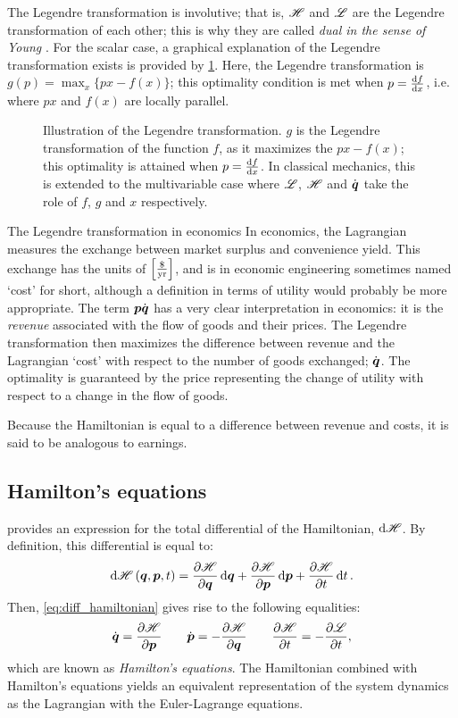 The Legendre transformation is involutive; that is, $\mathscr{H}$ and $\mathscr{L}$ are the Legendre transformation of each other; this is why they are called \emph{dual in the sense of Young} \cite{Arnold1989}. For the scalar case, a graphical explanation of the Legendre transformation exists is provided by \cref{fig:legendre_transform}. Here, the Legendre transformation is $g(p) = \max_x \{px - f(x)\}$; this optimality condition is met when $p = \dv{f}{x}$, i.e. where $px$ and $f(x)$ are locally parallel.
\begin{figure}
    \centering
    
    \caption{Illustration of the Legendre transformation. $g$ is the Legendre transformation of the function $f$, as it maximizes the $px - f(x)$; this optimality is attained when $p = \dv{f}{x}$. In classical mechanics, this is extended to the multivariable case where $\mathscr{L}$, $\mathscr{H}$ and $\dot{\vb*{q}}$ take the role of $f$, $g$ and $x$ respectively.}
    \label{fig:legendre_transform}
\end{figure}

\begin{econ}{The Legendre transformation in economics}
    In economics, the Lagrangian measures the exchange between market surplus and convenience yield. This exchange has the units of $\qty[\frac{\$}{\text{yr}}]$, and is in economic engineering sometimes named `cost' for short, although a definition in terms of utility would probably be more appropriate. The term $\vb*{p}\dot{\vb*{q}}$ has a very clear interpretation in economics: it is the \emph{revenue} associated with the flow of goods and their prices. The Legendre transformation then maximizes the difference between revenue and the Lagrangian `cost' with respect to the number of goods exchanged; $\dot{\vb*{q}}$. The optimality is guaranteed by the price representing the change of utility with respect to a change in the flow of goods.

    Because the Hamiltonian is equal to a difference between revenue and costs, it is said to be analogous to earnings.
\end{econ}

\subsection{Hamilton's equations}
\label{sec:hamilton_eqs}
 provides an expression for the total differential of the Hamiltonian, $\dd{\ensuremath{\mathscr{H}}}$. By definition, this differential is equal to:
$$ \dd{\ensuremath{\mathscr{H}}}(\vb*{q}, \vb*{p}, t) = \pdv{\ensuremath{\mathscr{H}}}{\ensuremath{\vb*{q}}}\dd{\ensuremath{\vb*{q}}} + \pdv{\ensuremath{\mathscr{H}}}{\ensuremath{\vb*{p}}}\dd{\ensuremath{\vb*{p}}} + \pdv{\ensuremath{\mathscr{H}}}{t}\dd{t}. $$
Then, \cref{eq:diff_hamiltonian} gives rise to the following equalities:
\begin{equation}
    \dot{\vb*{q}} = \pdv{\ensuremath{\mathscr{H}}}{\ensuremath{\vb*{p}}} \qquad \dot{\vb*{p}} = -\pdv{\ensuremath{\mathscr{H}}}{\ensuremath{\vb*{q}}} \qquad \pdv{\ensuremath{\mathscr{H}}}{t} = - \pdv{\ensuremath{\mathscr{L}}}{t},
    \label{eq:ham_eqs}
\end{equation}
which are known as \emph{Hamilton's equations}. The Hamiltonian combined with Hamilton's equations yields an equivalent representation of the system dynamics as the Lagrangian with the Euler-Lagrange equations.

